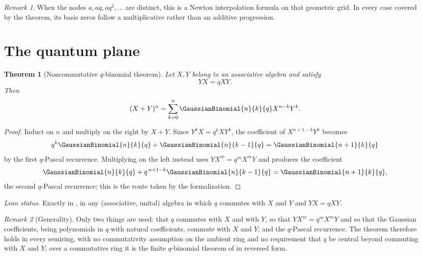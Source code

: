 \documentclass[11pt,a4paper,oneside,openany]{book}
\newtheorem{theorem}{Theorem}[chapter]
\theoremstyle{definition}
\theoremstyle{remark}
\newtheorem{remark}[remark]{Remark}
\begin{document}
\begin{remark}
When the nodes $a,aq,aq^2,\ldots$ are distinct, this is a Newton interpolation formula on that geometric grid.  In every case covered by the theorem, its basis zeros follow a multiplicative rather than an additive progression.
\end{remark}

\section{The quantum plane}

\begin{theorem}[Noncommutative $q$-binomial theorem]\label{thm:quantum-binomial}
Let $X,Y$ belong to an associative algebra and satisfy
\[
 YX=qXY.
\]
Then
\[
 (X+Y)^n=\sum_{k=0}^{n}\GaussianBinomial{n}{k}{q}X^{n-k}Y^k.
\]
\end{theorem}

\begin{proof}
Induct on $n$ and multiply on the right by $X+Y$.  Since $Y^kX=q^kXY^k$, the coefficient of $X^{n+1-k}Y^k$ becomes
\[
 q^k\GaussianBinomial{n}{k}{q}+\GaussianBinomial{n}{k-1}{q}=\GaussianBinomial{n+1}{k}{q}
\]
by the first $q$-Pascal recurrence.  Multiplying on the left instead uses $YX^{m}=q^{m}X^{m}Y$ and produces the coefficient
\[
 \GaussianBinomial{n}{k}{q}+q^{\,n+1-k}\GaussianBinomial{n}{k-1}{q}=\GaussianBinomial{n+1}{k}{q},
\]
the second $q$-Pascal recurrence; this is the route taken by the formalization.
\end{proof}

\emph{Lean status.}  Exactly  in ,
in any (associative, unital) algebra in which $q$ commutes with $X$ and $Y$ and $YX=qXY$.


\begin{remark}[Generality]\label{rem:quantum-binomial-generality}
Only two things are used: that $q$ commutes with $X$ and with $Y$, so that $YX^m=q^mX^mY$ and so that the Gaussian coefficients, being polynomials in $q$ with natural coefficients, commute with $X$ and $Y$; and the $q$-Pascal recurrence.  The theorem therefore holds in every semiring, with no commutativity assumption on the ambient ring and no requirement that $q$ be central beyond commuting with $X$ and $Y$; over a commutative ring it is the finite $q$-binomial theorem of  in reversed form.
\end{remark}

\end{document}
